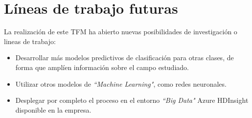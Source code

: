\chapter{Líneas de trabajo futuras}
\label{chapter:lineasdetrabajo}

La realización de este TFM ha abierto nuevas posibilidades de investigación o lineas de trabajo:
\begin{itemize}
    \item Desarrollar más modelos predictivos de clasificación para otras clases, de forma que amplíen información sobre el campo estudiado.
    \item Utilizar otros modelos de \textit{``Machine Learning"}, como redes neuronales.
    \item Desplegar por completo el proceso en el entorno \textit{``Big Data"} Azure HDInsight disponible en la empresa.
\end{itemize}



